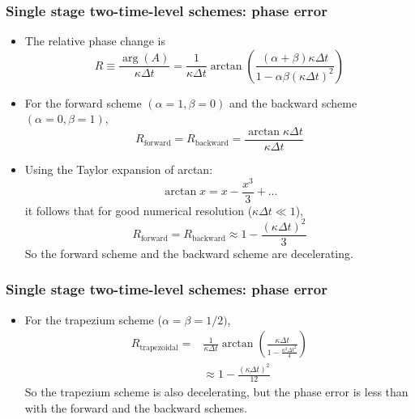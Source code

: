 \documentclass[aspectratio=43,9pt]{beamer}
\begin{document}
%
%
%
\begin{frame}
	\frametitle{Single stage two-time-level schemes: phase error}
	\begin{itemize}
		\item The relative phase change is
			\begin{equation*}
				R \equiv \frac{\arg(A)}{\kappa\Delta t}=
				\frac{1}{\kappa \Delta t} \arctan \left( \frac{\left(\alpha +\beta \right) \kappa  \Delta t}
					{1 - \alpha \beta \left( \kappa \Delta t\right)^2} \right)
			\end{equation*}
		\item For the forward scheme $(\alpha=1, \beta=0)$ and the backward scheme $(\alpha=0, \beta=1)$,
			\begin{equation*}
				R_\text{forward} = R_\text{backward} = \frac{\arctan \kappa \Delta t}{\kappa \Delta t}
			\end{equation*}
		\item Using the Taylor expansion of arctan:
			\begin{equation*}
				\arctan x = x -\frac{x^3}{3} + \dots
			\end{equation*}
			it follows that for good numerical resolution ($\kappa\Delta t \ll 1$),
			\begin{equation*}
				R_\text{forward} = R_\text{backward} \approx 1 - \frac{\left( \kappa \Delta t \right)^2}{3}
			\end{equation*}
			So the forward scheme and the backward scheme are decelerating.
	\end{itemize}
\end{frame}
%
%
%
\begin{frame}
	\frametitle{Single stage two-time-level schemes: phase error}
	\begin{itemize}
		\item For the trapezium scheme ($\alpha=\beta=1/2)$,
		\begin{align*}
			R_\text{trapezoidal} =& \frac{1}{\kappa \Delta t} \arctan \left(\frac{\kappa \Delta t}{1 - \frac{\kappa^2 \Delta t^2}{4}}\right) \\
			&\approx 1 - \frac{\left(\kappa \Delta t\right)^2}{12}
		\end{align*}
		So the trapezium scheme is also decelerating, but the phase error is less than with the forward and the backward schemes.
	\end{itemize}
%
\end{frame}
\end{document}
